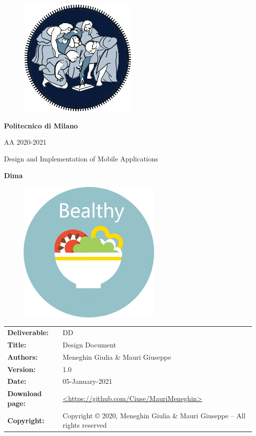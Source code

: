 \documentclass [12pt]{article}
\begin{document}
\begin{figure}[ht!]
\centering
\includegraphics[height=5.8cm,width=5.8cm]{logopoli.png}
\end{figure}
\begin{large}
\centerline{\textbf{Politecnico di Milano} }
\centerline{AA 2020-2021}
\vspace{0.5cm}
\centerline{Design and Implementation of Mobile Applications}
\centerline{\textbf{Dima}}
\end{large}

\begin{figure}[ht!]
\centering
\includegraphics[width=7cm, height=7cm]{Immaginecopertina.png}
\end{figure} 

\clearpage

\begin{table}[h!]
\begin{tabu} to \textwidth { X[0.3,r,p] X[0.7,l,p] }
\hline

\textbf{Deliverable:} & DD\\
\textbf{Title:} & Design Document \\
\textbf{Authors:} & Meneghin Giulia \& Mauri Giuseppe \\
\textbf{Version:} & 1.0 \\ 
\textbf{Date:} & 05-January-2021 \\
\textbf{Download page:} & \url{<https://github.com/Ciuse/MauriMeneghin>} \\
\textbf{Copyright:} & Copyright © 2020, Meneghin Giulia \& Mauri Giuseppe – All rights reserved \\
\hline
\end{tabu}
\end{table}
\end{document}
